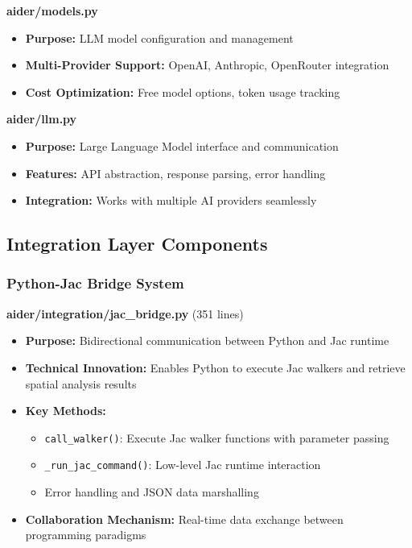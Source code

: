 \documentclass[12pt,a4paper]{article}
\begin{document}
\textbf{aider/models.py}
\begin{itemize}
    \item \textbf{Purpose:} LLM model configuration and management
    \item \textbf{Multi-Provider Support:} OpenAI, Anthropic, OpenRouter integration
    \item \textbf{Cost Optimization:} Free model options, token usage tracking
\end{itemize}

\textbf{aider/llm.py}
\begin{itemize}
    \item \textbf{Purpose:} Large Language Model interface and communication
    \item \textbf{Features:} API abstraction, response parsing, error handling
    \item \textbf{Integration:} Works with multiple AI providers seamlessly
\end{itemize}

\subsection{Integration Layer Components}

\subsubsection{Python-Jac Bridge System}

\textbf{aider/integration/jac\_bridge.py} (351 lines)
\begin{itemize}
    \item \textbf{Purpose:} Bidirectional communication between Python and Jac runtime
    \item \textbf{Technical Innovation:} Enables Python to execute Jac walkers and retrieve spatial analysis results
    \item \textbf{Key Methods:}
    \begin{itemize}
        \item \texttt{call\_walker()}: Execute Jac walker functions with parameter passing
        \item \texttt{\_run\_jac\_command()}: Low-level Jac runtime interaction
        \item Error handling and JSON data marshalling
    \end{itemize}
    \item \textbf{Collaboration Mechanism:} Real-time data exchange between programming paradigms
\end{itemize}
\end{document}
